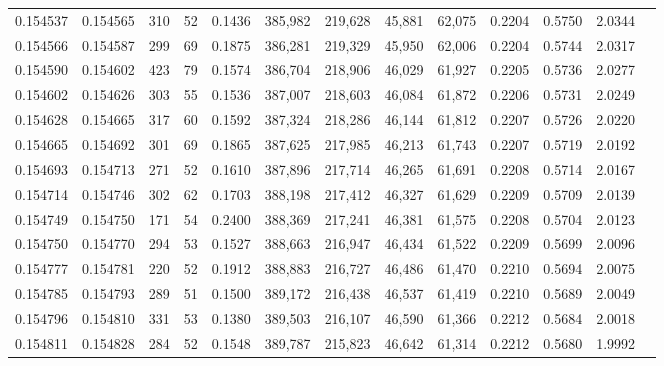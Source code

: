 \begin{tabular}{rrrrrrrrrrrrr}
0.154537 & 0.154565 &   310 &  52 &                                     0.1436 & 385,982 & 219,628 &  45,881 &  62,075 & 0.2204 & 0.5750 & 2.0344 \\
0.154566 & 0.154587 &   299 &  69 &                                     0.1875 & 386,281 & 219,329 &  45,950 &  62,006 & 0.2204 & 0.5744 & 2.0317 \\
0.154590 & 0.154602 &   423 &  79 &                                     0.1574 & 386,704 & 218,906 &  46,029 &  61,927 & 0.2205 & 0.5736 & 2.0277 \\
0.154602 & 0.154626 &   303 &  55 &                                     0.1536 & 387,007 & 218,603 &  46,084 &  61,872 & 0.2206 & 0.5731 & 2.0249 \\
0.154628 & 0.154665 &   317 &  60 &                                     0.1592 & 387,324 & 218,286 &  46,144 &  61,812 & 0.2207 & 0.5726 & 2.0220 \\
0.154665 & 0.154692 &   301 &  69 &                                     0.1865 & 387,625 & 217,985 &  46,213 &  61,743 & 0.2207 & 0.5719 & 2.0192 \\
0.154693 & 0.154713 &   271 &  52 &                                     0.1610 & 387,896 & 217,714 &  46,265 &  61,691 & 0.2208 & 0.5714 & 2.0167 \\
0.154714 & 0.154746 &   302 &  62 &                                     0.1703 & 388,198 & 217,412 &  46,327 &  61,629 & 0.2209 & 0.5709 & 2.0139 \\
0.154749 & 0.154750 &   171 &  54 &                                     0.2400 & 388,369 & 217,241 &  46,381 &  61,575 & 0.2208 & 0.5704 & 2.0123 \\
0.154750 & 0.154770 &   294 &  53 &                                     0.1527 & 388,663 & 216,947 &  46,434 &  61,522 & 0.2209 & 0.5699 & 2.0096 \\
0.154777 & 0.154781 &   220 &  52 &                                     0.1912 & 388,883 & 216,727 &  46,486 &  61,470 & 0.2210 & 0.5694 & 2.0075 \\
0.154785 & 0.154793 &   289 &  51 &                                     0.1500 & 389,172 & 216,438 &  46,537 &  61,419 & 0.2210 & 0.5689 & 2.0049 \\
0.154796 & 0.154810 &   331 &  53 &                                     0.1380 & 389,503 & 216,107 &  46,590 &  61,366 & 0.2212 & 0.5684 & 2.0018 \\
0.154811 & 0.154828 &   284 &  52 &                                     0.1548 & 389,787 & 215,823 &  46,642 &  61,314 & 0.2212 & 0.5680 & 1.9992 \\

\end{tabular}
